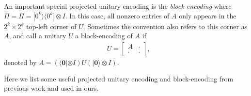 \documentclass[journal]{IEEEtran}
\begin{document}
An important special projected unitary encoding is the \textit{block-encoding} where $\widetilde{\Pi} = \Pi = |%
0^k\rangle \langle 0^k %
|\otimes I$. In this case, {all nonzero entries of} $A$ only appears in the $2^k\times 2^k$ top-left corner of $U$. Sometimes the convention also refers to this corner as $A$, and call a unitary $U$ a block-encoding of $A$ if 
\begin{align}
&U=\left[\begin{array}{cc}
A  & \cdot \\
\cdot & \cdot
\end{array}\right] \nonumber ,
\end{align}
denoted by $A=(\langle \mathbf{0}| \otimes I) U(|\mathbf{0}\rangle \otimes I)$.

Here we list some useful projected unitary encoding and block-encoding from previous work and used in ours.
\end{document}
